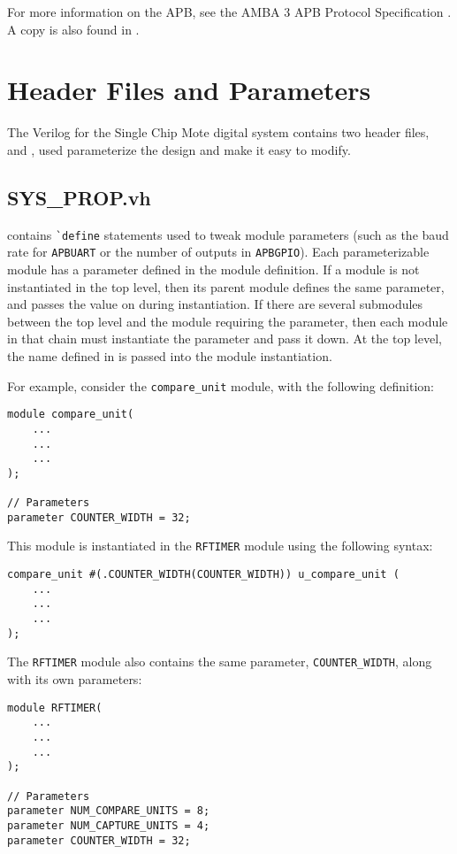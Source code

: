 For more information on the APB, see the AMBA 3 APB Protocol Specification \cite{apb-spec}. A copy is also found in .

\section{Header Files and Parameters}
The Verilog for the Single Chip Mote digital system contains two header files,  and , used parameterize the design and make it easy to modify. 

\subsection{SYS\_PROP.vh}
 contains \texttt{\`{}define} statements used to tweak module parameters (such as the baud rate for \texttt{APBUART} or the number of outputs in \texttt{APBGPIO}). Each parameterizable module has a parameter defined in the module definition. If a module is not instantiated in the top level, then its parent module defines the same parameter, and passes the value on during instantiation. If there are several submodules between the top level and the module requiring the parameter, then each module in that chain must instantiate the parameter and pass it down. At the top level, the name defined in  is passed into the module instantiation.

For example, consider the \texttt{compare\_unit} module, with the following definition:
\begin{lstlisting}
module compare_unit(
	...
	...
	...
);

// Parameters
parameter COUNTER_WIDTH = 32;
\end{lstlisting}

This module is instantiated in the \texttt{RFTIMER} module using the following syntax:

\begin{lstlisting}
compare_unit #(.COUNTER_WIDTH(COUNTER_WIDTH)) u_compare_unit (
	...
	...
	...
);
\end{lstlisting}

The \texttt{RFTIMER} module also contains the same parameter, \texttt{COUNTER\_WIDTH}, along with its own parameters:

\begin{lstlisting}
module RFTIMER(
	...
	...
	...
);

// Parameters
parameter NUM_COMPARE_UNITS = 8;
parameter NUM_CAPTURE_UNITS = 4;
parameter COUNTER_WIDTH = 32;
\end{lstlisting}

